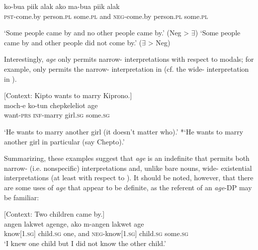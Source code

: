 \documentclass[output=paper]{LSP/langsci}
\begin{document}
\begin{exe}
\ex \label{ex:landman:scopepl}
  \gll ko-bua piik alak ako ma-bua piik alak\\	
	   \textsc{pst}-come.by person.\textsc{pl} some.\textsc{pl} and \textsc{neg}-come.by person.\textsc{pl} some.\textsc{pl}\\
  \begin{xlist}
  \ex \label{ex:landman:narrowpl}‘Some people came by and no other people came by.’ (Neg > $\exists$)
  \ex \label{ex:landman:widepl} ‘Some people came by and other people did not come by.’  ($\exists$  > Neg)  
  \end{xlist}   
\end{exe}

 Interestingly, \textit{age} only permits narrow- interpretations with respect to modals; for example,  only permits the narrow- interpretation in  (cf. the wide- interpretation in ).

\begin{exe}
\ex \label{ex:landman:29} [Context: Kipto wants to marry Kiprono.]\\
 \gll moch-e	ko-tun	chepkeleliot age\\	
want-\textsc{prs} \textsc{inf}-marry girl.\textsc{sg} some.\textsc{sg}\\
\begin{xlist}
  \ex \label{ex:landman:30}‘He wants to marry another girl (it doesn't matter who).’
  \ex \label{ex:landman:31} *‘He wants to marry another girl in particular (say Chepto).’ 
  \end{xlist}   
\end{exe}

Summarizing, these examples suggest that \textit{age} is an indefinite that permits both narrow- (i.e. nonspecific) interpretations and, unlike bare nouns, wide- existential interpretations (at least with respect to ). It should be noted, however, that there are some uses of \textit{age} that appear to be definite, as the referent of an \textit{age}-DP may be familiar:

\ea \label{ex:landman:modalage} [Context: Two children came by.]\\
\gll angen lakwet agenge, ako m-angen lakwet age\\
     know[\textsc{1.sg}] child.\textsc{sg} one, and \textsc{neg}-know[\textsc{1.sg}] child.\textsc{sg} some.\textsc{sg}\\
\glt ‘I knew one child but I did not know the other child.’ 
\z
\end{document}
